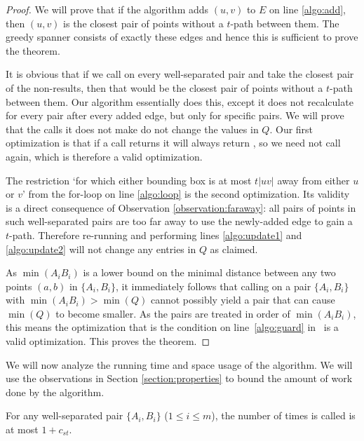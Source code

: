 \documentclass[runningheads,envcountsame,oribibl,orivec]{llncs}
\begin{document}
\begin{proof}
We will prove that if the algorithm adds $(u, v)$ to $E$ on line \ref{algo:add}, then $(u, v)$ is the closest pair of points without a $t$-path between them. The greedy spanner consists of exactly these edges and hence this is sufficient to prove the theorem.

It is obvious that if we call  on every well-separated pair and take the closest pair of the non-\qnil results, then that would be the closest pair of points without a $t$-path between them. Our algorithm essentially does this, except it does not recalculate  for every pair after every added edge, but only for specific pairs. We will prove that the calls it does not make do not change the values in $Q$. Our first optimization is that if a call  returns \qnil it will always return \qnil, so we need not call  again, which is therefore a valid optimization.

The restriction `for which either bounding box is at most $t|uv|$ away from either $u$ or $v$' from the for-loop on line \ref{algo:loop} is the second optimization. Its validity is a direct consequence of Observation \ref{observation:faraway}: all pairs of points in such well-separated pairs are too far away to use the newly-added edge to gain a $t$-path. Therefore re-running  and performing lines \ref{algo:update1} and \ref{algo:update2} will not change any entries in $Q$ as claimed.

As $\min(A_i B_i)$ is a lower bound on the minimal distance between any two points $(a, b)$ in $\{ A_i, B_i \}$, it immediately follows that calling  on a pair $\{ A_i, B_i \}$ with $\min(A_i B_i) > \min(Q)$ cannot possibly yield a pair that can cause $\min(Q)$ to become smaller. As the pairs are treated in order of $\min(A_i B_i)$, this means the optimization that is the condition on line~\ref{algo:guard} in~ is a valid optimization. This proves the theorem.
\end{proof}

We will now analyze the running time and space usage of the algorithm. We will use the observations in Section \ref{section:properties} to bound the amount of work done by the algorithm.

\begin{lemma} \label{lemma:closestpaircount}
For any well-separated pair $\{ A_i, B_i \}$ {\normalfont($1 \leq i \leq m$)}, the number of times  is called is at most $1 + c_{s t}$.
\end{lemma}
\end{document}
